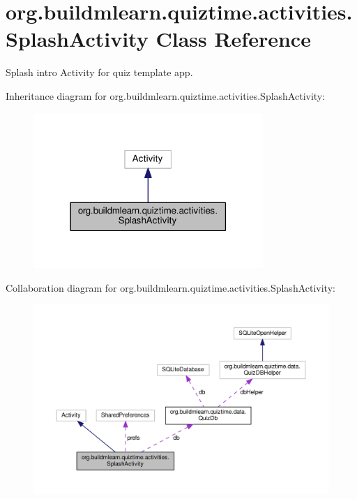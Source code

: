 \hypertarget{classorg_1_1buildmlearn_1_1quiztime_1_1activities_1_1SplashActivity}{}\section{org.\+buildmlearn.\+quiztime.\+activities.\+Splash\+Activity Class Reference}
\label{classorg_1_1buildmlearn_1_1quiztime_1_1activities_1_1SplashActivity}


Splash intro Activity for quiz template app.  




Inheritance diagram for org.\+buildmlearn.\+quiztime.\+activities.\+Splash\+Activity\+:
\nopagebreak
\begin{figure}[H]
\begin{center}
\leavevmode
\includegraphics[width=247pt]{classorg_1_1buildmlearn_1_1quiztime_1_1activities_1_1SplashActivity__inherit__graph}
\end{center}
\end{figure}


Collaboration diagram for org.\+buildmlearn.\+quiztime.\+activities.\+Splash\+Activity\+:
\nopagebreak
\begin{figure}[H]
\begin{center}
\leavevmode
\includegraphics[width=350pt]{classorg_1_1buildmlearn_1_1quiztime_1_1activities_1_1SplashActivity__coll__graph}
\end{center}
\end{figure}
